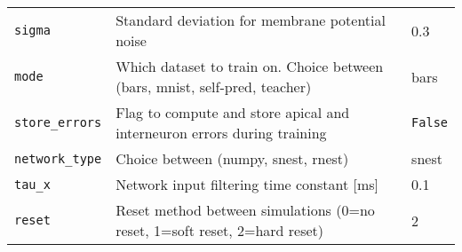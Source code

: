\begin{table}
\begin{center}
\begin{tabular}{p{}p{}p{}}
      \texttt{sigma}               & Standard deviation for membrane potential noise                             & 0.3
      \\
      \texttt{mode}                & Which dataset to train on. Choice between (bars, mnist, self-pred, teacher) & bars
      \\
      \texttt{store\_errors}       & Flag to compute and store apical and interneuron errors during training     &
      \texttt{False}
      \\
      \texttt{network\_type}       & Choice between (numpy, snest, rnest)                                        & snest
      \\
      \texttt{tau\_x}              & Network input filtering time constant [ms]                                  & 0.1
      \\
      \texttt{reset}               & Reset method between simulations (0=no reset, 1=soft reset, 2=hard reset)   & 2
      \\


\end{tabular}
\end{center}
\end{table}
